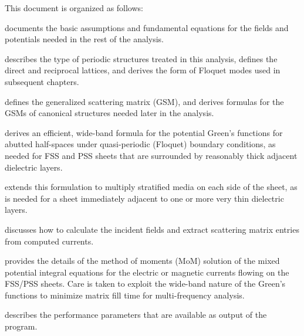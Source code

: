 \documentclass[
letterpaper, %
11pt, %
oneside, 
onecolumn, %
openany, %
]{memoir}
\numberwithin{equation}{chapter}
\numberwithin{figure}{chapter}
\renewcommand{\theequation}{\arabic{chapter}.\arabic{equation}}
\begin{document}
This document is organized as follows:
\begin{description}[align=left]
  \item[Chapter~\ref{chap:fund}] documents the basic assumptions and
  fundamental equations for the fields and potentials needed in the
  rest of the analysis.
  \item[Chapter~\ref{chap:periodicity}] describes the type of
  periodic structures treated in this analysis, defines the direct and
  reciprocal lattices, and derives the form of Floquet modes used in
  subsequent chapters.
  \item[Chapter~\ref{chap:gsm}] defines the generalized 
  scattering matrix (GSM), and derives formulas for the GSMs of
  canonical structures needed later in the analysis.
  \item[Chapter~\ref{chap:mpgf}] derives an efficient, wide-band
  formula for the potential Green's functions for abutted half-spaces
  under quasi-periodic (Floquet) boundary conditions, as needed for
  FSS and PSS sheets that are surrounded by reasonably thick adjacent
  dielectric layers.
  \item[Chapter~\ref{chap:gfstratified}] extends this formulation to
  multiply stratified media on each side of the sheet, as is needed for
  a sheet immediately adjacent to one or more very thin dielectric
  layers.
  \item[Chapter~\ref{chap:incgsm}] discusses how to calculate the
  incident fields and extract scattering matrix entries from computed 
  currents.
  \item[Chapter~\ref{chap:mom}] provides the details of the method of
    moments (MoM) solution of the mixed potential integral equations for  
    the electric or magnetic currents flowing on the FSS/PSS sheets.
    Care is taken to exploit the wide-band nature of the Green's
    functions to minimize matrix fill time for multi-frequency
    analysis.
  \item[Chapter~\ref{chap:performance}] describes the performance parameters
      that are available as output of the program.
\end{description}


\mainmatter












\appendix
\renewcommand{\theequation}{\Alph{chapter}.\arabic{equation}}
\end{document}
